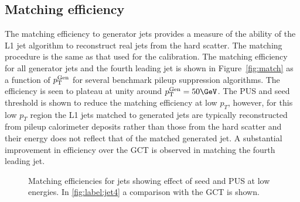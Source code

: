 \subsection{Matching efficiency}

The matching efficiency to generator jets provides a measure of the ability of the L1 jet algorithm 
to reconstruct real jets from the hard scatter. The matching procedure is the same as that used for the calibration. 
The matching efficiency for all generator jets and the fourth leading jet is shown 
in Figure~\ref{fig:match} as a function of ${p_{\text T}^{\text{Gen}}}$ for several benchmark pileup suppression algorithms. 
The efficiency is seen to plateau at unity around $\Genpt=50\GeV$. The PUS and seed threshold is shown to reduce
the matching efficiency at low $p_T$, however, for this low $p_T$ region the L1 jets matched to generated jets are typically
reconstructed from pileup calorimeter deposits rather than those from the hard scatter and their energy does not 
reflect that of the matched generated jet. A substantial improvement in efficiency over the GCT is observed in 
matching the fourth leading jet.





\begin{figure}
\begin{center}
\caption{Matching efficiencies for jets showing effect of seed and PUS at low energies. In \ref{fig:label:jet4} 
a comparison with the GCT is shown.}
\label{match}
\end{center}
\end{figure}


